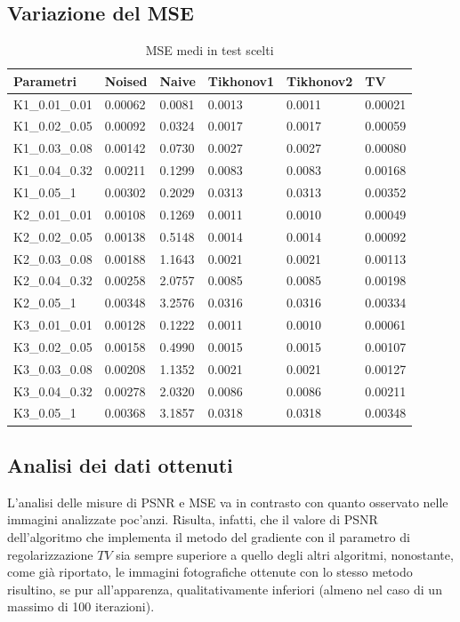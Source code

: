 \documentclass[12pt]{article}
\begin{document}
    \subsection{Variazione del MSE}
    \begin{table}[!ht]
    \centering
    \begin{tabular}{|l|l|l|l|l|l|}
    \hline
        Parametri & Noised & Naive & Tikhonov1 & Tikhonov2 & TV \\ \hline
        K1\_0.01\_0.01 & 0.00062 & 0.0081 & 0.0013 & 0.0011 & 0.00021 \\ \hline
        K1\_0.02\_0.05 & 0.00092 & 0.0324 & 0.0017 & 0.0017 & 0.00059 \\ \hline
        K1\_0.03\_0.08 & 0.00142 & 0.0730 & 0.0027 & 0.0027 & 0.00080 \\ \hline
        K1\_0.04\_0.32 & 0.00211 & 0.1299 & 0.0083 & 0.0083 & 0.00168 \\ \hline
        K1\_0.05\_1    & 0.00302 & 0.2029 & 0.0313 & 0.0313 & 0.00352 \\ \hline
        K2\_0.01\_0.01 & 0.00108 & 0.1269 & 0.0011 & 0.0010 & 0.00049 \\ \hline
        K2\_0.02\_0.05 & 0.00138 & 0.5148 & 0.0014 & 0.0014 & 0.00092 \\ \hline
        K2\_0.03\_0.08 & 0.00188 & 1.1643 & 0.0021 & 0.0021 & 0.00113 \\ \hline
        K2\_0.04\_0.32 & 0.00258 & 2.0757 & 0.0085 & 0.0085 & 0.00198 \\ \hline
        K2\_0.05\_1    & 0.00348 & 3.2576 & 0.0316 & 0.0316 & 0.00334 \\ \hline
        K3\_0.01\_0.01 & 0.00128 & 0.1222 & 0.0011 & 0.0010 & 0.00061 \\ \hline
        K3\_0.02\_0.05 & 0.00158 & 0.4990 & 0.0015 & 0.0015 & 0.00107 \\ \hline
        K3\_0.03\_0.08 & 0.00208 & 1.1352 & 0.0021 & 0.0021 & 0.00127 \\ \hline
        K3\_0.04\_0.32 & 0.00278 & 2.0320 & 0.0086 & 0.0086 & 0.00211 \\ \hline
        K3\_0.05\_1    & 0.00368 & 3.1857 & 0.0318 & 0.0318 & 0.00348 \\ \hline
    \end{tabular}
    \caption{MSE medi in test scelti }
    \label{table:4}
    \end{table}

    \subsection{Analisi dei dati ottenuti}
    L'analisi delle misure di PSNR e MSE va in contrasto con quanto osservato nelle immagini analizzate poc'anzi. Risulta, infatti, che il valore di PSNR dell'algoritmo che implementa il metodo del gradiente con il parametro di regolarizzazione $TV$ sia sempre superiore a quello degli altri algoritmi, nonostante, come già riportato, le immagini fotografiche ottenute con lo stesso metodo risultino, se pur all'apparenza, qualitativamente inferiori (almeno nel caso di un massimo di 100 iterazioni).
\end{document}
